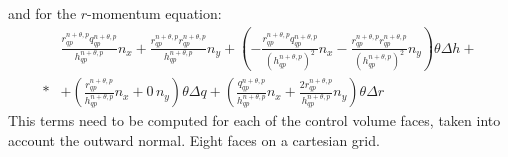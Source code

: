 and for the $r$-momentum equation:
\begin{align}
    &\frac{r^{n+\theta, p}_{qp}q^{n+\theta, p}_{qp}}{h^{n+\theta, p}_{qp}} n_x+
     \frac{r^{n+\theta, p}_{qp}r^{n+\theta, p}_{qp}}{h^{n+\theta, p}_{qp}} n_y
   + \left( -\frac{r^{n+\theta, p}_{qp}q^{n+\theta, p}_{qp}}{(h^{n+\theta, p}_{qp})^2} n_x -
\frac{r^{n+\theta, p}_{qp}r^{n+\theta, p}_{qp}}{(h^{n+\theta, p}_{qp})^2} n_y \right) \theta \Delta h +
\nonumber \\*
& +
\left( \frac{r^{n+\theta, p}_{qp}}{h^{n+\theta, p}_{qp}} n_x  + 0\, n_y \right) \theta \Delta q +
\left (
\frac{q^{n+\theta, p}_{qp}}{h^{n+\theta, p}_{qp}} n_x
+ \frac{2 r^{n+\theta, p}_{qp}}{h^{n+\theta, p}_{qp}} n_y \right) \theta \Delta r
\end{align}
This terms need to be computed for each of the control volume faces, taken into account the outward normal.
Eight faces on a cartesian grid.

